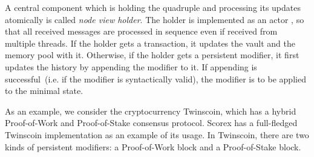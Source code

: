 A central component which is holding the quadruple {\em <history, minimal state, vault, memory pool>} and processing its updates atomically is called {\em node view holder}. The holder is implemented as an actor , so that all received messages are processed in sequence even if received from multiple threads. If the holder gets a transaction, it updates the vault and the memory pool with it. Otherwise, if the holder gets a persistent modifier, it first updates the history by appending the modifier to it. If appending is successful~(i.e. if the modifier is syntactically valid), the modifier is to be applied to the minimal state.  

As an example, we consider the cryptocurrency Twinscoin, which has a hybrid Proof-of-Work and Proof-of-Stake consensus protocol. Scorex has a full-fledged Twinscoin implementation as an example of its usage. In Twinscoin, there are two kinds of persistent modifiers: a Proof-of-Work block and a Proof-of-Stake block. 
